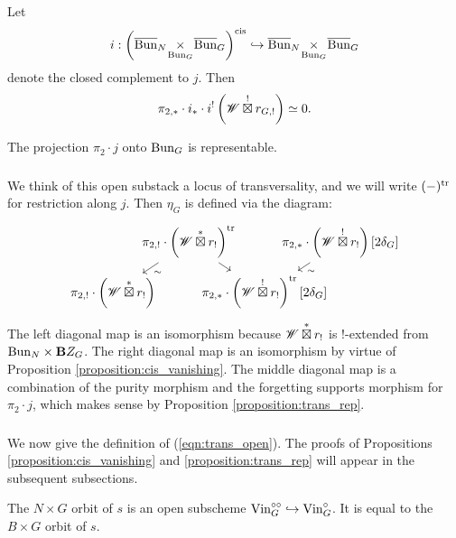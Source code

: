 \begin{proposition}
\label{proposition:cis_vanishing}
Let
\[
   i: \left( \overline{\mathrm{Bun}}_N \!\underset{\mathrm{Bun}_G}{\times}\! \overline{\mathrm{Bun}}_G \right)^{\mathrm{cis}} \hookrightarrow \overline{\mathrm{Bun}}_N \!\underset{\mathrm{Bun}_G}{\times}\! \overline{\mathrm{Bun}}_G
\]
denote the closed complement to $j$. Then
  \[\pi_{2,*} \cdot i_* \cdot i^! \left( \mathscr{W} \overset{!}{\boxtimes} r_{G,!} \right) \simeq 0.\]
\end{proposition}

\begin{proposition}
\label{proposition:trans_rep}
The projection $\pi_2 \cdot j$ onto $\mathrm{Bun}_G$ is representable.
\end{proposition}

\subsubsection{} We think of this open substack a locus of transversality, and we will write $(-)^{\mathrm{tr}}$ for restriction along $j$. Then $\eta_G$ is defined via the diagram:
\[
\begin{tikzcd}[
  column sep={6em,between origins},
  row sep={4em,between origins}
]
  & \pi_{2, !} \cdot \left( \WW \stoximes r_! \right)^\trans \arrow[dr] \arrow[dl, "\sim"] & & \pi_{2, *} \cdot \left( \WW \shoximes r_! \right) [2 \delta_G] \arrow[dl, "\sim"] \\
  \pi_{2, !} \cdot \left( \WW \stoximes r_! \right) & & \pi_{2, *} \cdot \left( \WW \shoximes r_! \right)^\trans [2 \delta_G] &
\end{tikzcd}
\]
The left diagonal map is an isomorphism because $\mathscr{W} \overset{*}{\boxtimes} r_!$ is $!$-extended from $\mathrm{Bun}_N \times \mathbf{B} Z_G$. The right diagonal map is an isomorphism by virtue of Proposition \ref{proposition:cis_vanishing}. The middle diagonal map is a combination of the purity morphism and the forgetting supports morphism for $\pi_2 \cdot j$, which makes sense by Proposition \ref{proposition:trans_rep}.

\subsubsection{} We now give the definition of (\ref{eqn:trans_open}). The proofs of Propositions \ref{proposition:cis_vanishing} and \ref{proposition:trans_rep} will appear in the subsequent subsections.

\begin{proposition}
\label{proposition:open_orbit}
The $N \times G$ orbit of $s$ is an open subscheme $\mathrm{Vin}_G^{\circ\circ} \hookrightarrow \mathrm{Vin}_G^\circ$. It is equal to the $B \times G$ orbit of $s$.
\end{proposition}

